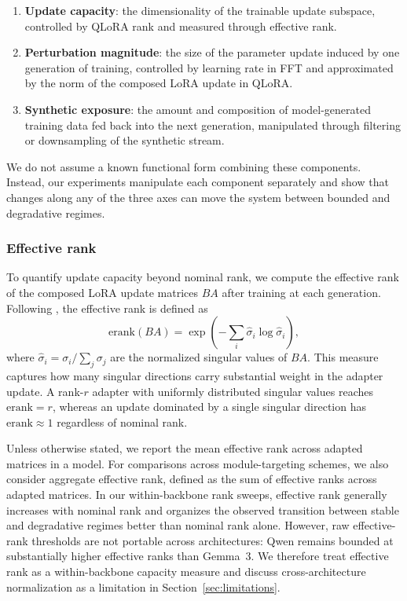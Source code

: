 \documentclass[a4paper,fleqn]{cas-dc}
\begin{document}
\begin{enumerate}
    \item \textbf{Update capacity}: the dimensionality of the trainable update
    subspace, controlled by QLoRA rank and measured through effective rank.

    \item \textbf{Perturbation magnitude}: the size of the parameter update
    induced by one generation of training, controlled by learning rate in FFT and
    approximated by the norm of the composed LoRA update in QLoRA.

    \item \textbf{Synthetic exposure}: the amount and composition of
    model-generated training data fed back into the next generation, manipulated
    through filtering or downsampling of the synthetic stream.
\end{enumerate}

We do not assume a known functional form combining these components. Instead,
our experiments manipulate each component separately and show that changes along
any of the three axes can move the system between bounded and degradative
regimes.

\subsubsection{Effective rank}\label{sec:erank}
To quantify update capacity beyond nominal rank, we compute the effective rank
of the composed LoRA update matrices $BA$ after training at each generation.
Following \citet{roy2007}, the effective rank is defined as
\begin{equation}\label{eq:erank}
    \mathrm{erank}(BA) =
    \exp\!\left(-\sum_i \hat{\sigma}_i \log \hat{\sigma}_i\right),
\end{equation}
where $\hat{\sigma}_i = \sigma_i / \sum_j \sigma_j$ are the normalized singular
values of $BA$. This measure captures how many singular directions carry
substantial weight in the adapter update. A rank-$r$ adapter with uniformly
distributed singular values reaches $\mathrm{erank}=r$, whereas an update
dominated by a single singular direction has $\mathrm{erank}\approx 1$ regardless
of nominal rank.

Unless otherwise stated, we report the mean effective rank across adapted
matrices in a model. For comparisons across module-targeting schemes, we also
consider aggregate effective rank, defined as the sum of effective ranks across
adapted matrices. In our within-backbone rank sweeps, effective rank generally
increases with nominal rank and organizes the observed transition between
stable and degradative regimes better than nominal rank alone. However,
raw effective-rank thresholds are not portable across architectures: Qwen
remains bounded at substantially higher effective ranks than Gemma~3. We
therefore treat effective rank as a within-backbone capacity measure and discuss
cross-architecture normalization as a limitation in Section~\ref{sec:limitations}.
\end{document}
